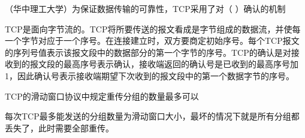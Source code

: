 \question （华中理工大学）为保证数据传输的可靠性，TCP采用了对（ ）确认的机制
\par{}
\begin{solution}TCP是面向字节流的。TCP将所要传送的报文看成是字节组成的数据流，并使每一个字节对应于一个序号。在连接建立时，双方要商定初始序号。每个TCP报文的序列号值表示该报文段中的数据部分的第一个字节的序号。TCP的确认是对接收到的报文段的最高序号表示确认，接收端返回的确认号是已收到的最高序号加1，因此确认号表示接收端期望下次收到的报文段中的第一个数据字节的序号。
\end{solution}
\question TCP的滑动窗口协议中规定重传分组的数量最多可以
\par{}
\begin{solution}每次TCP最多能发送的分组数量为滑动窗口大小，最坏的情况下就是所有分组都丢失了，此时需要全部重传。
\end{solution}
